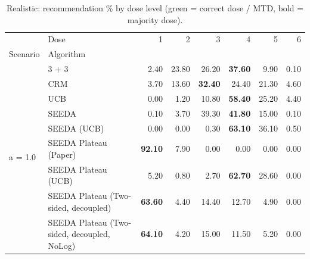 \begin{table}[H]
\centering
\caption{Realistic: recommendation \% by dose level (green = correct dose / MTD, bold = majority dose).}
\label{tab:real_rec_by_dose}
\begin{tabular}{llrrrrrr}
\toprule
 & Dose & 1 & 2 & 3 & 4 & 5 & 6 \\
Scenario & Algorithm &  &  &  &  &  &  \\
\midrule
\multirow[c]{9}{*}{a = 1.0} & 3 + 3 & 2.40 & 23.80 & {\cellcolor[HTML]{C8E6C9}} 26.20 & \bfseries 37.60 & 9.90 & 0.10 \\
 & CRM & 3.70 & 13.60 & {\cellcolor[HTML]{C8E6C9}} \bfseries 32.40 & 24.40 & 21.30 & 4.60 \\
 & UCB & 0.00 & 1.20 & {\cellcolor[HTML]{C8E6C9}} 10.80 & \bfseries 58.40 & 25.20 & 4.40 \\
 & SEEDA & 0.10 & 3.70 & {\cellcolor[HTML]{C8E6C9}} 39.30 & \bfseries 41.80 & 15.00 & 0.10 \\
 & SEEDA (UCB) & 0.00 & 0.00 & {\cellcolor[HTML]{C8E6C9}} 0.30 & \bfseries 63.10 & 36.10 & 0.50 \\
 & SEEDA Plateau (Paper) & \bfseries 92.10 & 7.90 & {\cellcolor[HTML]{C8E6C9}} 0.00 & 0.00 & 0.00 & 0.00 \\
 & SEEDA Plateau (UCB) & 5.20 & 0.80 & {\cellcolor[HTML]{C8E6C9}} 2.70 & \bfseries 62.70 & 28.60 & 0.00 \\
 & SEEDA Plateau (Two-sided, decoupled) & \bfseries 63.60 & 4.40 & {\cellcolor[HTML]{C8E6C9}} 14.40 & 12.70 & 4.90 & 0.00 \\
 & SEEDA Plateau (Two-sided, decoupled, NoLog) & \bfseries 64.10 & 4.20 & {\cellcolor[HTML]{C8E6C9}} 15.00 & 11.50 & 5.20 & 0.00 \\
\bottomrule
\end{tabular}
\end{table}
